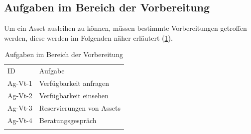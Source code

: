 \subsection{Aufgaben im Bereich der Vorbereitung}
Um ein Asset ausleihen zu können, müssen bestimmte Vorbereitungen getroffen werden, diese werden im
Folgenden näher erläutert (\ref{table:Ag-Vt}).

\begin{table}[h]
        \centering
        \caption{Aufgaben im Bereich der Vorbereitung}
        \begin{tabular}{ll}
                \arrayrulecolor{maincolor}\hline
                \sffamily\color{maincolor}ID & \sffamily\color{maincolor}Aufgabe \\
                \arrayrulecolor{maincolor}\hline
                Ag-Vt-1                      & Verfügbarkeit anfragen            \\
                Ag-Vt-2                      & Verfügbarkeit einsehen            \\
                Ag-Vt-3                      & Reservierungen von Assets         \\
                Ag-Vt-4                      & Beratungsgespräch                 \\
                \arrayrulecolor{maincolor}\hline
        \end{tabular}
        \label{table:Ag-Vt}
\end{table}

